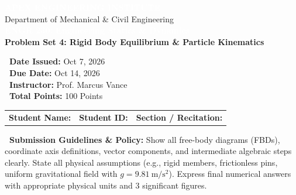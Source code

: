 \documentclass[11pt, a4paper, titlepage=false]{scrartcl}
\begin{document}
\begin{tcolorbox}[
    enhanced,
    colback=PrimaryDark,
    colframe=PrimaryDark,
    arc=4pt,
    boxrule=0pt,
    top=12pt, bottom=12pt, left=14pt, right=14pt
]
    \begin{minipage}{0.65\textwidth}
        \textcolor{white}{\large \textbf{APEX ENGINEERING INSTITUTE}}\\
        \textcolor{SecondaryTeal!30}{\small Department of Mechanical \& Civil Engineering}\\[4pt]
        \textcolor{white}{\Large \textbf{ENGR 230: Engineering Statics \& Dynamics}}\\[2pt]
        \textcolor{AccentAmber!90}{\bfseries Problem Set 4: Rigid Body Equilibrium \& Particle Kinematics}
    \end{minipage}%
    \begin{minipage}{0.35\textwidth}
        \color{white}\small
        \raggedleft
        \textbf{\faCalendar\ Date Issued:} Oct 7, 2026\\
        \textbf{\faClock\ Due Date:} Oct 14, 2026\\
        \textbf{\faUser\ Instructor:} Prof. Marcus Vance\\
        \textbf{\faLayerGroup\ Total Points:} 100 Points
    \end{minipage}
\end{tcolorbox}

\vspace{-4pt}

\begin{tcolorbox}[
    enhanced,
    colback=BgLight,
    colframe=BorderColor,
    arc=3pt,
    boxrule=0.8pt,
    top=6pt, bottom=6pt, left=10pt, right=10pt
]
    \small\color{NeutralDark}
    \begin{tabularx}{\textwidth}{@{}X X X@{}}
        \textbf{Student Name:} \underline{\hspace{4.5cm}} &
        \textbf{Student ID:} \underline{\hspace{3.5cm}} &
        \textbf{Section / Recitation:} \underline{\hspace{2.5cm}}
    \end{tabularx}
\end{tcolorbox}

\begin{conceptbox}
    \small\color{NeutralDark}
    \textbf{\faExclamationTriangle\ Submission Guidelines \& Policy:}
    Show all free-body diagrams (FBDs), coordinate axis definitions, vector components, and intermediate algebraic steps clearly. State all physical assumptions (e.g., rigid members, frictionless pins, uniform gravitational field with $g = \SI{9.81}{\meter\per\second\squared}$). Express final numerical answers with appropriate physical units and 3 significant figures.
\end{conceptbox}
\end{document}
